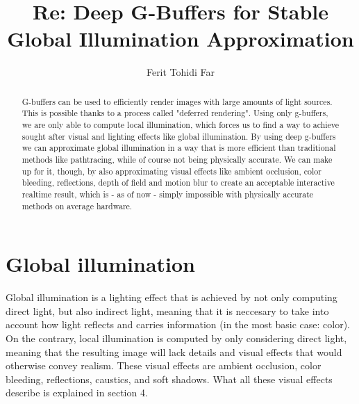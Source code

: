 \documentclass{ACGSeminar}
\begin{document}
\title{Re: Deep G-Buffers for Stable Global Illumination Approximation}

\author{Ferit Tohidi Far}

\maketitle


\begin{abstract}%
G-buffers can be used to efficiently render images with large amounts of light sources. This is possible thanks to a process called "deferred rendering". Using 
only g-buffers, we are only able to compute local illumination, which forces us to find a way to achieve sought after visual and lighting effects like global 
illumination. By using deep g-buffers we can approximate global illumination in a way that is more efficient than traditional methods like pathtracing, 
while of course not being physically accurate. We can make up for it, though, by also approximating visual effects like ambient occlusion, color bleeding, reflections, 
depth of field and motion blur to create an acceptable interactive realtime result, which is - as of now - simply impossible with physically accurate methods on 
average hardware.
\end{abstract}

\tableofcontents

\label{cha:references}

\newpage

\label{cha:introduction}
\section{Global illumination}
	Global illumination is a lighting effect that is achieved by not only computing direct light, but also indirect light, meaning that it is neccesary to take	into account how light reflects and carries information (in the most basic case: color). On the contrary, local illumination is computed by only considering direct light, meaning that the resulting image will lack details and visual effects that would otherwise convey realism. These visual effects are ambient occlusion, color bleeding, reflections, caustics, and soft shadows. What all these visual effects describe is explained in section 4.
\end{document}
